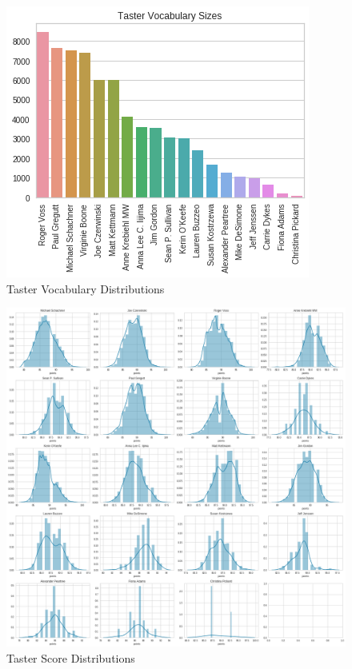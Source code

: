 \documentclass[12pt]{IEEEtran}
\begin{document}
\begin{figure}[h]
    \centering
    \includegraphics[width=\columnwidth]{taster_vocabularies}
    \caption{Taster Vocabulary Distributions}
\end{figure}

\begin{figure}
    \centering
    \includegraphics[width=\linewidth]{taster_score_distributions}
    \caption{Taster Score Distributions}
\end{figure}
\end{document}

